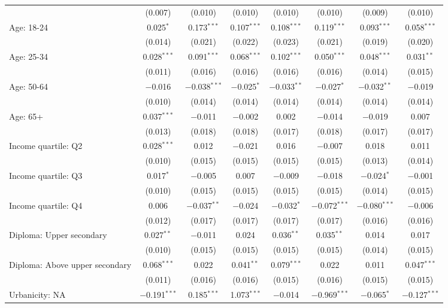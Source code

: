 \begin{tabular}{@{\extracolsep{5pt}}lccccccc}
  & (0.007) & (0.010) & (0.010) & (0.010) & (0.010) & (0.009) & (0.010) \\ 
  Age: 18\mbox{-}24 & 0.025$^{*}$ & 0.173$^{***}$ & 0.107$^{***}$ & 0.108$^{***}$ & 0.119$^{***}$ & 0.093$^{***}$ & 0.058$^{***}$ \\ 
  & (0.014) & (0.021) & (0.022) & (0.023) & (0.021) & (0.019) & (0.020) \\ 
  Age: 25\mbox{-}34 & 0.028$^{***}$ & 0.091$^{***}$ & 0.068$^{***}$ & 0.102$^{***}$ & 0.050$^{***}$ & 0.048$^{***}$ & 0.031$^{**}$ \\ 
  & (0.011) & (0.016) & (0.016) & (0.016) & (0.016) & (0.014) & (0.015) \\ 
  Age: 50\mbox{-}64 & $-$0.016 & $-$0.038$^{***}$ & $-$0.025$^{*}$ & $-$0.033$^{**}$ & $-$0.027$^{*}$ & $-$0.032$^{**}$ & $-$0.019 \\ 
  & (0.010) & (0.014) & (0.014) & (0.014) & (0.014) & (0.014) & (0.014) \\ 
  Age: 65+ & 0.037$^{***}$ & $-$0.011 & $-$0.002 & 0.002 & $-$0.014 & $-$0.019 & 0.007 \\ 
  & (0.013) & (0.018) & (0.018) & (0.017) & (0.018) & (0.017) & (0.017) \\ 
  Income quartile: Q2 & 0.028$^{***}$ & 0.012 & $-$0.021 & 0.016 & $-$0.007 & 0.018 & 0.011 \\ 
  & (0.010) & (0.015) & (0.015) & (0.015) & (0.015) & (0.013) & (0.014) \\ 
  Income quartile: Q3 & 0.017$^{*}$ & $-$0.005 & 0.007 & $-$0.009 & $-$0.018 & $-$0.024$^{*}$ & $-$0.001 \\ 
  & (0.010) & (0.015) & (0.015) & (0.015) & (0.015) & (0.014) & (0.015) \\ 
  Income quartile: Q4 & 0.006 & $-$0.037$^{**}$ & $-$0.024 & $-$0.032$^{*}$ & $-$0.072$^{***}$ & $-$0.080$^{***}$ & $-$0.006 \\ 
  & (0.012) & (0.017) & (0.017) & (0.017) & (0.017) & (0.016) & (0.016) \\ 
  Diploma: Upper secondary & 0.027$^{**}$ & $-$0.011 & 0.024 & 0.036$^{**}$ & 0.035$^{**}$ & 0.014 & 0.017 \\ 
  & (0.010) & (0.015) & (0.015) & (0.015) & (0.015) & (0.014) & (0.015) \\ 
  Diploma: Above upper secondary & 0.068$^{***}$ & 0.022 & 0.041$^{**}$ & 0.079$^{***}$ & 0.022 & 0.011 & 0.047$^{***}$ \\ 
  & (0.011) & (0.016) & (0.016) & (0.015) & (0.016) & (0.015) & (0.015) \\ 
  Urbanicity: NA & $-$0.191$^{***}$ & 0.185$^{***}$ & 1.073$^{***}$ & $-$0.014 & $-$0.969$^{***}$ & $-$0.065$^{*}$ & $-$0.127$^{***}$ \\ 

\end{tabular}

